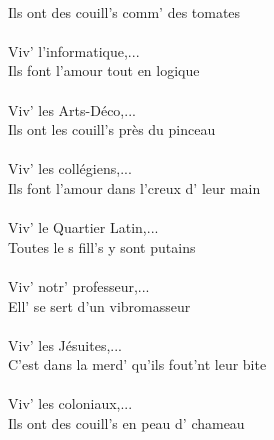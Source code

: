 \\Ils ont des couill's comm' des tomates
\\\\Viv' l'informatique,...
\\Ils font l'amour tout en logique
\\\\Viv' les Arts-Déco,...
\\Ils ont les couill's près du pinceau
\\\\Viv' les collégiens,...
\\Ils font l'amour dans l'creux d' leur main
\\\\Viv' le Quartier Latin,...
\\Toutes le s fill's y sont putains
\\\\Viv' notr' professeur,...
\\Ell' se sert d'un vibromasseur
\\\\Viv' les Jésuites,...
\\C'est dans la merd' qu'ils fout'nt leur bite
\\\\Viv' les coloniaux,...
\\Ils ont des couill's en peau d' chameau

\breakpage